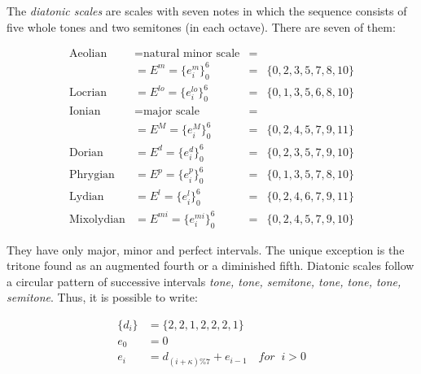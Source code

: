The \emph{diatonic scales} are scales with seven notes in which the sequence consists of five whole tones and two semitones (in each octave). There are seven of them:

\begin{equation}\label{eq:escalas}
\begin{aligned}
	\text{Aeolian}    & = \text{natural minor scale}  & = & \\
			  & = E^m = \{e_i^m\}_0^6       & = & \{0,2,3,5,7,8,10\} \\
	\text{Locrian}    & = E^{lo} = \{e_i^{lo}\}_0^6 & = & \{0,1,3,5,6,8,10\} \\ 
	\text{Ionian}     & = \text{major scale}          & = &  \\
			  & = E^M = \{e_i^M\}_0^6       & = & \{0,2,4,5,7,9,11\} \\
	\text{Dorian}     & = E^{d} = \{e_i^{d}\}_0^6   & = & \{0,2,3,5,7,9,10\} \\
	\text{Phrygian}   & = E^{p} = \{e_i^{p}\}_0^6   & = & \{0,1,3,5,7,8,10\} \\
	\text{Lydian}     & = E^{l}=\{e_i^{l}\}_0^6     & = & \{0,2,4,6,7,9,11\} \\
	\text{Mixolydian} & = E^{mi} = \{e_i^{mi}\}_0^6 & = & \{0,2,4,5,7,9,10\}
\end{aligned}
\end{equation}

\noindent They have only major, minor and perfect intervals.
The unique exception is the tritone found as an augmented fourth or a diminished fifth.
Diatonic scales follow a circular pattern of successive intervals \textit{tone, tone, semitone, tone, tone, tone, semitone}. Thus, it is possible to write:

\begin{equation}\label{eq:relacaoDia}
\begin{split}
\{d_i\} & =\{2,2,1,2,2,2,1\} \\
e_0 & =0 \\
e_i & =d_{(i+\kappa)\%7}+e_{i-1} \quad for \;\;  i > 0
\end{split}
\end{equation}

